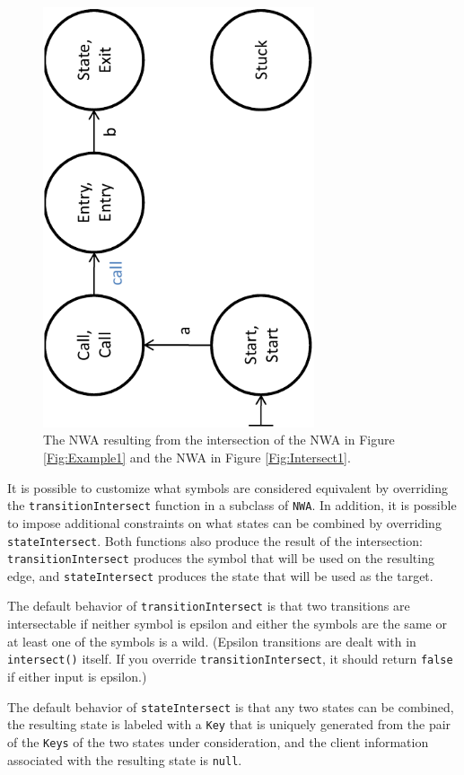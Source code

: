 \begin{figure}[htbp]
  \centering
    \includegraphics[width=8cm]{Figures/Figure6}
  \caption{The NWA resulting from the intersection of the NWA in Figure
    \ref{Fig:Example1} and the NWA in Figure \ref{Fig:Intersect1}.}
  \label{Fig:Intersect2}
\end{figure}

It is possible to customize what symbols are considered equivalent by
overriding the \texttt{transitionIntersect} function in a subclass of
\texttt{NWA}. In addition, it is possible to impose additional constraints on
what states can be combined by overriding \texttt{stateIntersect}. Both
functions also produce the result of the intersection:
\texttt{transitionIntersect} produces the symbol that will be used on the
resulting edge, and \texttt{stateIntersect} produces the state that will be
used as the target.

The default behavior of
\texttt{transitionIntersect} is that two transitions are intersectable if
neither symbol is epsilon and either the symbols are the same or at least one of
the symbols is a wild. (Epsilon transitions are dealt with in
\texttt{intersect()} itself. If you override \texttt{transitionIntersect}, it
should return \texttt{false} if either input is epsilon.)

The default behavior of \texttt{stateIntersect} is that any two
states can be combined, the resulting state is labeled with a
\texttt{Key} that is uniquely generated from the pair of the \texttt{Keys} of
the two states under consideration, and the client information associated
with the resulting state is \texttt{null}.


